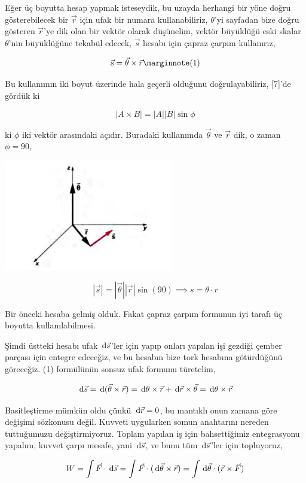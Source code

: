 \documentclass[12pt,fleqn]{article}\usepackage{../../common}
\begin{document}
Eğer üç boyutta hesap yapmak isteseydik, bu uzayda herhangi bir yöne doğru
gösterebilecek bir $\vec{r}$ için ufak bir numara kullanabiliriz, $\theta$'yi
sayfadan bize doğru gösteren $\vec{r}$'ye dik olan bir vektör olarak düşünelim,
vektör büyüklüğü eski skalar $\theta$'nin büyüklüğüne tekabül edecek, $\vec{s}$
hesabı için çapraz çarpım kullanırız,

$$
\vec{s} = \vec{\theta} \times \vec{r}
\mlabel{1}
$$

Bu kullanımın iki boyut üzerinde hala geçerli olduğunu doğrulayabiliriz, [7]'de
gördük ki

$$
|A \times B| = |A||B|\sin\phi
$$

ki $\phi$ iki vektör arasındaki açıdır. Buradaki kullanımda $\vec{\theta}$ ve
$\vec{r}$ dik, o zaman $\phi=90$,

\includegraphics[width=20em]{phy_005_basics_02_05.jpg}

$$
|\vec{s}| = |\vec{\theta}| |\vec{r}| \sin(90) \implies s = \theta \cdot r
$$

Bir önceki hesaba gelmiş olduk. Fakat çapraz çarpım formunun iyi tarafı
üç boyutta kullanılabilmesi. 

Şimdi üstteki hesabı ufak $\,\mathrm{d} \vec{s}$'ler için yapıp onları yapılan işi
gezdiği çember parçası için entegre edeceğiz, ve bu hesabın bize tork hesabına
götürdüğünü göreceğiz. (1) formülünün sonsuz ufak formunu türetelim,

$$
\,\mathrm{d} \vec{s} =
\,\mathrm{d} (\vec{\theta} \times \vec{r} ) =
\,\mathrm{d} \theta \times \vec{r} + \,\mathrm{d} \vec{r} \times \vec{\theta} =
\,\mathrm{d} \theta \times \vec{r}
$$

Basitleştirme mümkün oldu çünkü $\,\mathrm{d} \vec{r} = 0$, bu mantıklı onun zamana göre
değişimi sözkonusu değil. Kuvveti uygularken somun anahtarını nereden
tuttuğumuzu değiştirmiyoruz. Toplam yapılan iş için bahsettiğimiz entegrasyonu
yapalım, kuvvet çarpı mesafe, yani $\,\mathrm{d} \vec{s}$, ve bunu tüm $\,\mathrm{d} \vec{s}$'ler
için topluyoruz,

$$
W = \int \vec{F} \cdot \,\mathrm{d} \vec{s} =
\int \vec{F} \cdot (\,\mathrm{d} \vec{\theta} \times \vec{r}) =
\int \,\mathrm{d} \vec{\theta} \cdot (\vec{r}  \times \vec{F}) 
$$
\end{document}
